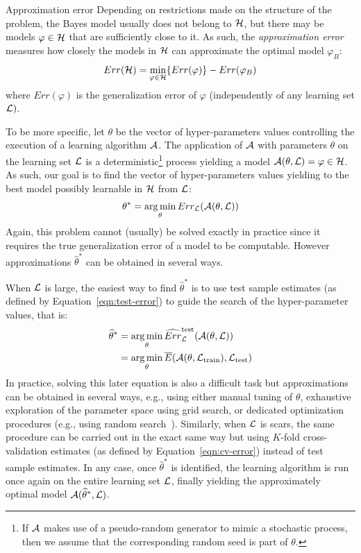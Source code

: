 \begin{remark}{Approximation error}
Depending on restrictions made on the structure of the problem, the
Bayes model usually does not belong to ${\cal H}$, but there may be models
$\varphi \in {\cal H}$ that are sufficiently close to it. As such, the
\textit{approximation error}~\citep{bottou:2011} measures how closely the
models in ${\cal H}$ can approximate the optimal model $\varphi_B$:
\begin{equation}
Err({\cal H}) = \min_{\varphi \in {\cal H}} \{ Err(\varphi) \} - Err(\varphi_B)
\end{equation}
where $Err(\varphi)$ is the generalization error of $\varphi$ (independently
of any learning set ${\cal L})$.
\end{remark}

To be more specific, let $\theta$ be the vector of hyper-parameters values
controlling the execution of a learning algorithm ${\cal A}$. The application
of ${\cal A}$ with parameters $\theta$ on the learning set ${\cal L}$ is a
deterministic\footnote{If ${\cal A}$ makes use of a pseudo-random generator to
mimic a stochastic process, then we assume that the corresponding random seed is
part of $\theta$.} process yielding a model ${\cal A}(\theta, {\cal L}) =
\varphi \in {\cal H}$. As such, our goal is to find the vector of hyper-parameters values
yielding to the best model possibly learnable in ${\cal H}$ from ${\cal L}$:
\begin{equation}
\theta^* = \operatorname*{arg\,min}_{\theta} Err_{\cal L}({\cal A}(\theta, {\cal L}))
\end{equation}
Again, this problem cannot (usually) be solved exactly in practice since
it requires the true generalization error of a model to be computable. However
approximations $\widehat{\theta}^*$ can be obtained in several ways.

When ${\cal L}$ is large, the easiest way to find $\widehat{\theta}^*$ is to
use test sample estimates (as defined by Equation~\ref{eqn:test-error}) to
guide the search of the hyper-parameter values, that is:
\begin{align}
\widehat{\theta}^* &= \operatorname*{arg\,min}_{\theta} \widehat{Err}^\text{test}_{\cal L}({\cal A}(\theta, {\cal L})) \\
                   &= \operatorname*{arg\,min}_{\theta} \overline{E}({\cal A}(\theta, {\cal L}_\text{train}), {\cal L}_\text{test})
\end{align}
In practice, solving this later equation is also a difficult task but
approximations can be obtained in several ways, e.g., using either manual
tuning of $\theta$, exhaustive exploration of the parameter space using grid
search, or dedicated optimization procedures (e.g., using random
search~\citep{bergstra:2012}). Similarly, when ${\cal L}$ is scars, the same
procedure can be carried out in the exact same way but using $K$-fold
cross-validation estimates (as defined by Equation~\ref{eqn:cv-error}) instead of test sample
estimates. In any case, once $\widehat{\theta}^*$ is identified, the learning
algorithm is run once again on the entire learning set ${\cal L}$, finally
yielding the approximately optimal model ${\cal A}(\widehat{\theta}^*, {\cal
L})$.

